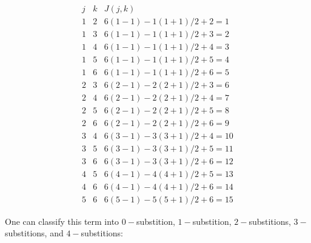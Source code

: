 \documentclass[aps, preprint]{revtex4}
\begin{document}
\begin{equation}\begin{array}{ccc}j & k & J \left (j ,k\right ) \\
1 & 2 & 6 \left (1 -1\right ) -1 \left (1 +1\right )/2 +2 =1 \\
1 & 3 & 6 \left (1 -1\right ) -1 \left (1 +1\right )/2 +3 =2 \\
1 & 4 & 6 \left (1 -1\right ) -1 \left (1 +1\right )/2 +4 =3 \\
1 & 5 & 6 \left (1 -1\right ) -1 \left (1 +1\right )/2 +5 =4 \\
1 & 6 & 6 \left (1 -1\right ) -1 \left (1 +1\right )/2 +6 =5 \\
2 & 3 & 6 \left (2 -1\right ) -2 \left (2 +1\right )/2 +3 =6 \\
2 & 4 & 6 \left (2 -1\right ) -2 \left (2 +1\right )/2 +4 =7 \\
2 & 5 & 6 \left (2 -1\right ) -2 \left (2 +1\right )/2 +5 =8 \\
2 & 6 & 6 \left (2 -1\right ) -2 \left (2 +1\right )/2 +6 =9 \\
3 & 4 & 6 \left (3 -1\right ) -3 \left (3 +1\right )/2 +4 =10 \\
3 & 5 & 6 \left (3 -1\right ) -3 \left (3 +1\right )/2 +5 =11 \\
3 & 6 & 6 \left (3 -1\right ) -3 \left (3 +1\right )/2 +6 =12 \\
4 & 5 & 6 \left (4 -1\right ) -4 \left (4 +1\right )/2 +5 =13 \\
4 & 6 & 6 \left (4 -1\right ) -4 \left (4 +1\right )/2 +6 =14 \\
5 & 6 & 6 \left (5 -1\right ) -5 \left (5 +1\right )/2 +6 =15\end{array}
\end{equation}

\bigskip One can classify this term into $0 -$substition, $1 -$substition, $2 -$substitions, $3 -$substitions, and $4 -$substitions: 
\end{document}
